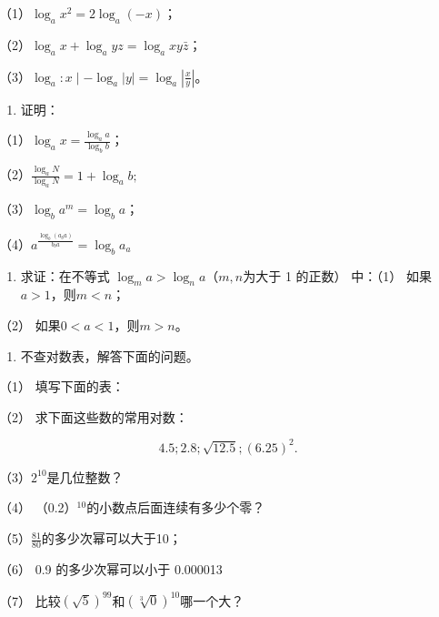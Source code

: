（1）\(\log_a x^2 = 2\log_a(-x)\)；

（2）\(\log_a x + \log_a yz = \log_a xy\bar{z}\)；

（3）\(\log_{a}: x \mid -\log_{a} |y| = \log_{a} \left| \frac{x}{y} \right|\)。

\begin{enumerate}[start=25]
\item
  证明：
\end{enumerate}

（1）\(\log_a x = \frac{\log_a a}{\log_b b}\)；

（2）\(\frac{\log_a N}{\log_a N} = 1 + \log_a b;\)

（3）\(\log_{b} a^{m} = \log_{b} a\)；

（4）\(a^{\frac{\log_{b}(a_{b}a)}{b_{b}a}} = \log_{b}a_{a}\)

\begin{enumerate}[start=26]
\item
  求证：在不等式 \(\log_m a > \log_n a\)（\(m, n\)为大于 1 的正数）
  中：（1） 如果\(a > 1\)，则\(m < n\)；
\end{enumerate}

（2） 如果\(0 < a < 1\)，则\(m > n\)。

\begin{enumerate}[start=27]
\item
  不查对数表，解答下面的问题。
\end{enumerate}

（1） 填写下面的表：

{\centering
\footnotesize\setlength{\tabcolsep}{2.6pt}%
\par
}

（2） 求下面这些数的常用对数：

\[
4.5; 2.8; \sqrt{12.5}; (6.25)^{2}.
\]

（3）\(2^{10}\)是几位整数？

（4） （0.2）\(^{10}\)的小数点后面连续有多少个零？

（5）\(\frac{81}{80}\)的多少次幂可以大于10；

（6） 0.9 的多少次幂可以小于 0.000013

（7） 比较\((\sqrt{5})^{99}\)和\((\sqrt[3]{0})^{10}\)哪一个大？

